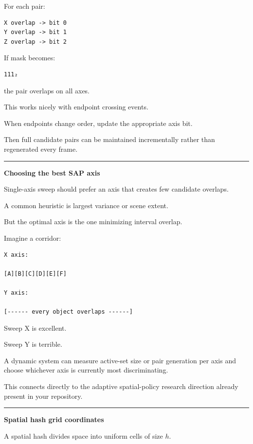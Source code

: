 For each pair:

\begin{verbatim}
X overlap -> bit 0
Y overlap -> bit 1
Z overlap -> bit 2
\end{verbatim}

If mask becomes:

\begin{verbatim}
111₂
\end{verbatim}

the pair overlaps on all axes.

This works nicely with endpoint crossing events.

When endpoints change order, update the appropriate axis bit.

Then full candidate pairs can be maintained incrementally rather than regenerated every frame.

\begin{center}\rule{0.5\linewidth}{0.5pt}\end{center}

\textbf{Choosing the best SAP axis}

Single-axis sweep should prefer an axis that creates few candidate overlaps.

A common heuristic is largest variance or scene extent.

But the optimal axis is the one minimizing interval overlap.

Imagine a corridor:

\begin{verbatim}
X axis:

[A][B][C][D][E][F]

Y axis:

[------ every object overlaps ------]
\end{verbatim}

Sweep X is excellent.

Sweep Y is terrible.

A dynamic system can measure active-set size or pair generation per axis and choose whichever axis is currently most discriminating.

This connects directly to the adaptive spatial-policy research direction already present in your repository.

\begin{center}\rule{0.5\linewidth}{0.5pt}\end{center}

\textbf{Spatial hash grid coordinates}

A spatial hash divides space into uniform cells of size \(h\).

